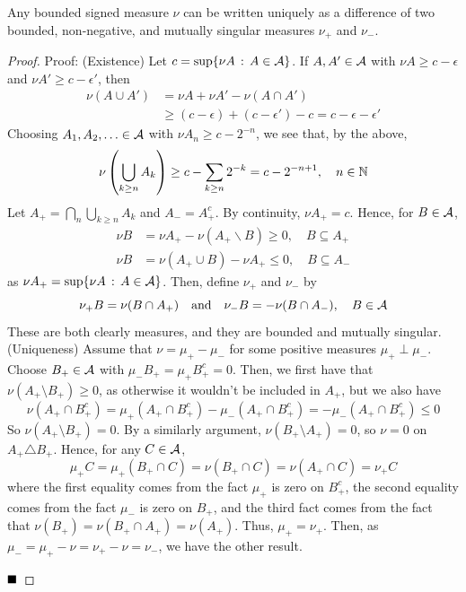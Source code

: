 \begin{theorem}
    Any bounded signed measure $\nu$ can be written uniquely as a difference of two bounded, non-negative, and mutually singular measures $\nu_{+}$ and $\nu_{-}$.
\end{theorem}
\begin{proof}{Proof:}
    (Existence) Let $c = \sup\{\nu A \col A \in \cal{A}\}$. If $A, A' \in \cal{A}$ with $\nu A \geq c - \epsilon$ and $\nu A' \geq c - \epsilon'$, then
    \begin{align*}
        \nu(A \cup A') &= \nu A + \nu A' - \nu(A \cap A')\\
        &\geq (c - \epsilon) + (c - \epsilon') - c = c - \epsilon - \epsilon'
    \end{align*}
    Choosing $A_1, A_2, \ldots \in \cal{A}$ with $\nu A_n \geq c - 2^{-n}$, we see that, by the above,
    \[ \nu\left(\bigcup_{k \geq n} A_k\right) \geq c - \sum_{k \geq n} 2^{-k} = c - 2^{-n + 1},\quad n \in \N \]
    Let $A_{+} = \bigcap_{n} \bigcup_{k \geq n} A_k$ and $A_{-} = A_{+}^{c}$. By continuity, $\nu A_{+} = c$. Hence, for $B \in \cal{A}$,
    \begin{align*}
        \nu B &= \nu A_{+} - \nu(A_{+} \backslash B) \geq 0, \quad B \subseteq A_{+}\\
        \nu B &= \nu(A_{+} \cup B) - \nu A_{+} \leq 0, \quad B \subseteq A_{-}
    \end{align*}
    as $\nu A_{+} = \sup\{\nu A \col A \in \cal{A}\}$. Then, define $\nu_{+}$ and $\nu_{-}$ by
    \[ \nu_{+}B = \nu(B \cap A_{+}) \quand \nu_{-}B = -\nu(B \cap A_{-}), \quad B \in \cal{A} \]
    These are both clearly measures, and they are bounded and mutually singular.\\

    (Uniqueness) Assume that $\nu = \mu_{+} - \mu_{-}$ for some positive measures $\mu_{+} \perp \mu_{-}$. Choose $B_{+} \in \cal{A}$ with $\mu_{-}B_{+} = \mu_{+}B_{+}^{c} = 0$. Then, we first have that $\nu(A_{+} \setminus B_{+}) \geq 0$, as otherwise it wouldn't be included in $A_{+}$, but we also have
    \[ \nu(A_{+} \cap B_{+}^{c}) = \mu_{+}(A_{+} \cap B_{+}^{c}) - \mu_{-}(A_{+} \cap B_{+}^{c}) = - \mu_{-}(A_{+} \cap B_{+}^{c}) \leq 0 \]
    So $\nu(A_{+} \setminus B_{+}) = 0$. By a similarly argument, $\nu(B_{+} \setminus A_{+}) = 0$, so $\nu = 0$ on $A_{+} \triangle B_{+}$. Hence, for any $C \in \cal{A}$,
    \[ \mu_{+}C = \mu_{+}(B_{+} \cap C) = \nu(B_{+} \cap C) = \nu(A_{+} \cap C) = \nu_{+}C \] 
    where the first equality comes from the fact $\mu_{+}$ is zero on $B_{+}^{c}$, the second equality comes from the fact $\mu_{-}$ is zero on $B_{+}$, and the third fact comes from the fact that $\nu(B_{+}) = \nu(B_{+} \cap A_{+}) = \nu(A_{+})$. Thus, $\mu_{+} = \nu_{+}$. Then, as $\mu_{-} = \mu_{+} - \nu = \nu_{+} - \nu = \nu_{-}$, we have the other result.

    $\qed$
\end{proof}


